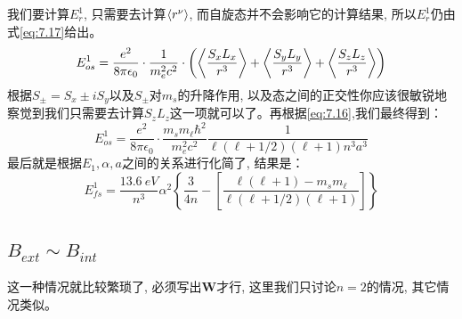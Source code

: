\documentclass[a4paper,zihao=-4,linespread=1]{ctexrep}
\begin{document}
    我们要计算$E_r^1$, 只需要去计算$\braket{r^\nu}$, 而自旋态并不会影响它的计算结果, 所以$E_r^1$仍由式\ref{eq:7.17}给出。
    \[E_{os}^1=\frac{e^2}{8\pi\epsilon_0}\cdot\frac{1}{m_e^2c^2}\cdot\left(\Braket{\frac{S_xL_x}{r^3}}+\Braket{\frac{S_yL_y}{r^3}}+\Braket{\frac{S_zL_z}{r^3}}\right)\]
    根据$S_{\pm}=S_x\pm iS_y$以及$S_\pm$对$m_s$的升降作用, 以及态之间的正交性你应该很敏锐地察觉到我们只需要去计算$S_zL_z$这一项就可以了。再根据\ref{eq:7.16},我们最终得到：
    \[E_{os}^1=\frac{e^2}{8\pi\epsilon_0}\cdot\frac{m_sm_\ell\hbar^2}{m_e^2c^2}\frac{1}{\ell(\ell+1/2)(\ell+1)n^3a^3}\]
    最后就是根据$E_1,\alpha,a$之间的关系进行化简了, 结果是：
    \begin{equation}
        \label{eq:7.29}
        E_{fs}^1=\frac{\SI{13.6}{eV}}{n^3}\alpha^2\left\{\frac{3}{4n}-\left[\frac{\ell(\ell+1)-m_sm_\ell}{\ell(\ell+1/2)(\ell+1)}\right]\right\}
    \end{equation}
    \subsection*{$B_{ext}\sim B_{int}$}
    这一种情况就比较繁琐了, 必须写出$\mathbf{W}$才行, 这里我们只讨论$n=2$的情况, 其它情况类似。
\end{document}
